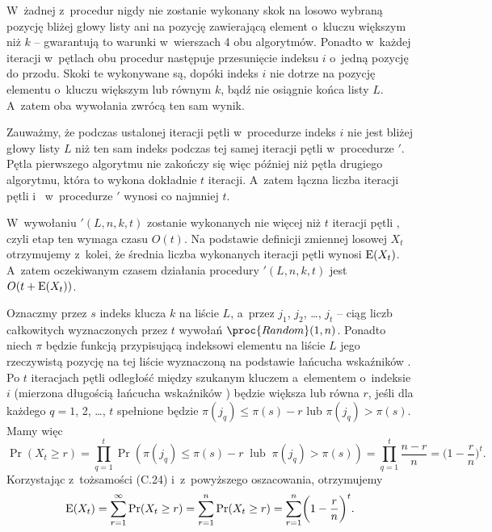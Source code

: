 \bignegskip

\subproblem %
W~żadnej z~procedur nigdy nie zostanie wykonany skok na losowo wybraną pozycję bliżej głowy listy ani na pozycję zawierającą element o~kluczu większym niż $k$ -- gwarantują to warunki w~wierszach 4 obu algorytmów.
Ponadto w~każdej iteracji w~pętlach  obu procedur następuje przesunięcie indeksu $i$ o~jedną pozycję do przodu.
Skoki te wykonywane są, dopóki indeks $i$ nie dotrze na pozycję elementu o~kluczu większym lub równym $k$, bądź nie osiągnie końca listy $L$.
A~zatem oba wywołania zwrócą ten sam wynik.

Zauważmy, że podczas ustalonej iteracji pętli  w~procedurze  indeks $i$ nie jest bliżej głowy listy $L$ niż ten sam indeks podczas tej samej iteracji pętli  w~procedurze $'$.
Pętla pierwszego algorytmu nie zakończy się więc później niż pętla drugiego algorytmu, która to wykona dokładnie $t$ iteracji.
A~zatem łączna liczba iteracji pętli  i~ w~procedurze $'$ wynosi co najmniej $t$.

\subproblem %
W~wywołaniu $'(L,n,k,t)$ zostanie wykonanych nie więcej niż $t$ iteracji pętli , czyli etap ten wymaga czasu $O(t)$.
Na podstawie definicji zmiennej losowej $X_t$ otrzymujemy z~kolei, że średnia liczba wykonanych iteracji pętli  wynosi $\operatorname{E}(X_t)$.
A~zatem oczekiwanym czasem działania procedury $'(L,n,k,t)$ jest $O(t+\operatorname{E}(X_t))$.

\subproblem %
Oznaczmy przez $s$ indeks klucza $k$ na liście $L$, a~przez $j_1$, $j_2$, \dots, $j_t$ -- ciąg liczb całkowitych wyznaczonych przez $t$ wywołań $\proc{Random}(1,n)$.
Ponadto niech $\pi$ będzie funkcją przypisującą indeksowi elementu na liście $L$ jego rzeczywistą pozycję na tej liście wyznaczoną na podstawie łańcucha wskaźników .
Po $t$ iteracjach pętli  odległość między szukanym kluczem a~elementem o~indeksie $i$ (mierzona długością łańcucha wskaźników ) będzie większa lub równa $r$, jeśli dla każdego $q=1$, 2, \dots, $t$ spełnione będzie $\pi(j_q)\le\pi(s)-r$ lub $\pi(j_q)>\pi(s)$.
Mamy więc
\[
	\Pr(X_t\ge r) = \prod_{q=1}^t\Pr(\pi(j_q)\le\pi(s)-r\;\;\text{lub}\;\;\pi(j_q)>\pi(s)) = \prod_{q=1}^t\frac{n-r}{n} = \biggl(1-\frac{r}{n}\biggr)^t.
\]
Korzystając z~tożsamości (C.24) i~z~powyższego oszacowania, otrzymujemy
\[
	\operatorname{E}(X_t) = \sum_{r=1}^\infty\Pr(X_t\ge r) = \sum_{r=1}^n\Pr(X_t\ge r) = \sum_{r=1}^n\biggl(1-\frac{r}{n}\biggr)^t.
\]

